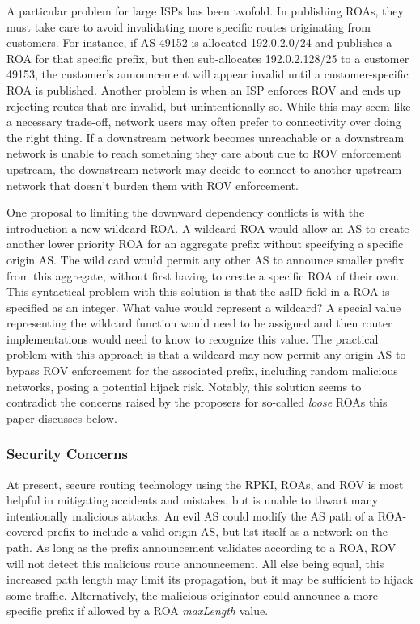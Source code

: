 \documentclass[sigconf]{acmart}
\begin{document}
A particular problem for large ISPs has been twofold.  In publishing
ROAs, they must take care to avoid invalidating more specific routes
originating from customers.  For instance, if AS 49152 is allocated
192.0.2.0/24 and publishes a ROA for that specific prefix, but then
sub-allocates 192.0.2.128/25 to a customer 49153, the customer's
announcement will appear invalid until a customer-specific ROA is
published.  Another problem is when an ISP enforces ROV and ends up
rejecting routes that are invalid, but unintentionally so.  While this
may seem like a necessary trade-off, network users may often prefer to
connectivity over doing the right thing.  If a downstream network
becomes unreachable or a downstream network is unable to reach something
they care about due to ROV enforcement upstream, the downstream network
may decide to connect to another upstream network that doesn't burden
them with ROV enforcement.

One proposal to limiting the downward dependency conflicts is with the
introduction a new wildcard ROA.\cite{gilad_are_2017}  A wildcard ROA
would allow an AS to create another lower priority ROA for an aggregate
prefix without specifying a specific origin AS.  The wild card would
permit any other AS to announce smaller prefix from this aggregate,
without first having to create a specific ROA of their own.  This
syntactical problem with this solution is that the asID field in a ROA
is specified as an integer.  What value would represent a wildcard?  A
special value representing the wildcard function would need to be
assigned and then router implementations would need to know to recognize
this value.  The practical problem with this approach is that a wildcard
may now permit any origin AS to bypass ROV enforcement for the
associated prefix, including random malicious networks, posing a
potential hijack risk.  Notably, this solution seems to contradict the
concerns raised by the proposers for so-called \emph{loose} ROAs
this paper discusses below.

\subsubsection{Security Concerns}

At present, secure routing technology using the RPKI, ROAs, and ROV is
most helpful in mitigating accidents and mistakes, but is unable to
thwart many intentionally malicious attacks.  An evil AS could modify
the AS path of a ROA-covered prefix to include a valid origin AS, but
list itself as a network on the path.  As long as the prefix
announcement validates according to a ROA, ROV will not detect this
malicious route announcement.  All else being equal, this increased path
length may limit its propagation, but it may be sufficient to hijack
some traffic.  Alternatively, the malicious originator could announce a
more specific prefix if allowed by a ROA \emph{maxLength} value.
\end{document}
